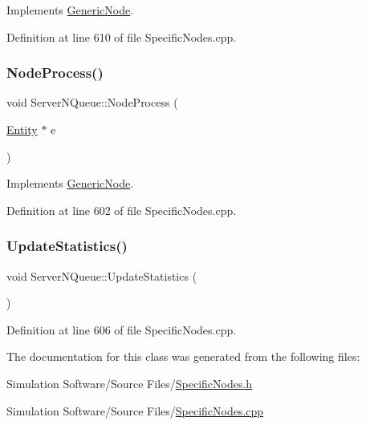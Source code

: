 Implements \hyperlink{class_generic_node_ae7c8424c8c14fd3de993c902d78deb67}{Generic\+Node}.



Definition at line 610 of file Specific\+Nodes.\+cpp.

\mbox{\label{class_server_n_queue_adbc0e634171f6dc0785f2e49659663f7}} 
\subsubsection{\texorpdfstring{Node\+Process()}{NodeProcess()}}
{\footnotesize\ttfamily void Server\+N\+Queue\+::\+Node\+Process (\begin{DoxyParamCaption}\item[{\hyperlink{class_entity}{Entity} $\ast$}]{e }\end{DoxyParamCaption})\hspace{0.3cm}{\ttfamily [virtual]}}



Implements \hyperlink{class_generic_node_ae942258a57f211072d179da470579add}{Generic\+Node}.



Definition at line 602 of file Specific\+Nodes.\+cpp.

\mbox{\label{class_server_n_queue_a08260b431df7adc0495f2e6c1d3ff33f}} 
\subsubsection{\texorpdfstring{Update\+Statistics()}{UpdateStatistics()}}
{\footnotesize\ttfamily void Server\+N\+Queue\+::\+Update\+Statistics (\begin{DoxyParamCaption}{ }\end{DoxyParamCaption})}



Definition at line 606 of file Specific\+Nodes.\+cpp.



The documentation for this class was generated from the following files\+:\begin{DoxyCompactItemize}
\item 
Simulation Software/\+Source Files/\hyperlink{_specific_nodes_8h}{Specific\+Nodes.\+h}\item 
Simulation Software/\+Source Files/\hyperlink{_specific_nodes_8cpp}{Specific\+Nodes.\+cpp}\end{DoxyCompactItemize}

